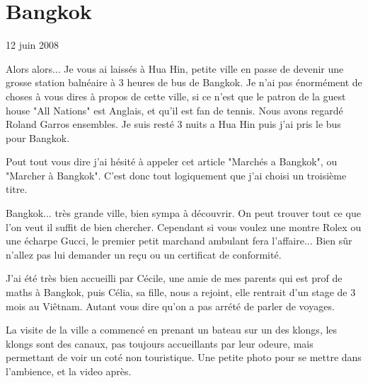 \section{Bangkok}

12 juin 2008

\begin{multicols}{2}

Alors alors... Je vous ai laissés à Hua Hin, petite ville en passe de devenir une grosse station balnéaire à 3 heures de bus de Bangkok. Je n'ai pas énormément de choses à vous dires à propos de cette ville, si ce n'est que le patron de la guest house "All Nations" est Anglais, et qu'il est fan de tennis. Nous avons regardé Roland Garros ensembles. Je suis resté 3 nuits a Hua Hin puis j'ai pris le bus pour Bangkok.

Pout tout vous dire j'ai hésité à appeler cet article "Marchés a Bangkok", ou "Marcher à Bangkok". C'est donc tout logiquement que j'ai choisi un troisième titre.

Bangkok... très grande ville, bien sympa à découvrir. On peut trouver tout ce que l'on veut il suffit de bien chercher. Cependant si vous voulez une montre Rolex ou une écharpe Gucci, le premier petit marchand ambulant fera l'affaire... Bien sûr n'allez pas lui demander un reçu ou un certificat de conformité.

J'ai été très bien accueilli par Cécile, une amie de mes parents qui est prof de maths à Bangkok, puis Célia, sa fille, nous a rejoint, elle rentrait d'un stage de 3 mois au Viêtnam. Autant vous dire qu'on a pas arrété de parler de voyages.

La visite de la ville a commencé en prenant un bateau sur un des klongs, les klongs sont des canaux, pas toujours accueillants par leur odeure, mais permettant de voir un coté non touristique. Une petite photo pour se mettre dans l'ambience, et la video après.




\end{multicols}
